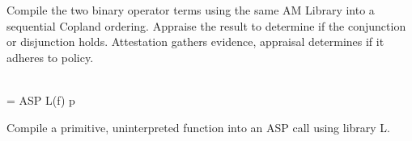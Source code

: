\documentclass[runningheads]{llncs}
\theoremstyle{definition}
\begin{document}
Compile the two binary operator terms using the same AM Library into a
sequential Copland ordering.  Appraise the result to determine if the
conjunction or disjunction holds.  Attestation gathers evidence,
appraisal determines if it adheres to policy.

\begin{definition}\\
 = ASP L(f) p
\end{definition}

Compile a primitive, uninterpreted function into an ASP call using
library L.

%
% 
%
%
%

%

%
\end{document}

